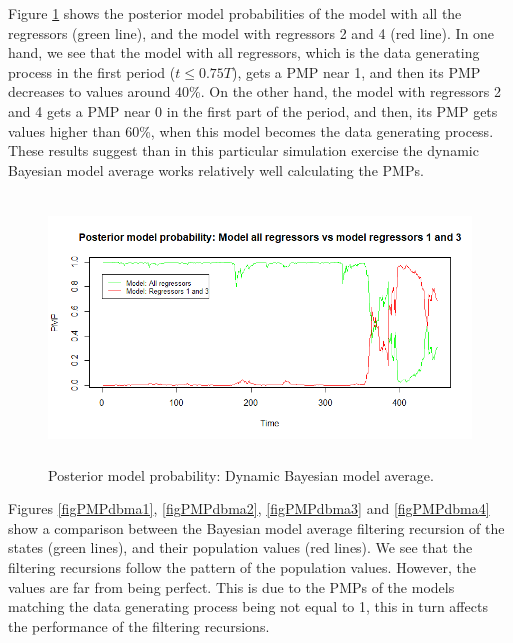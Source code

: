 Figure \ref{figPMPdbma} shows the posterior model probabilities of the model with all the regressors (green line), and the model with regressors 2 and 4 (red line). In one hand, we see that the model with all regressors, which is the data generating process in the first period ($t\leq 0.75T$), gets a PMP near 1, and then its PMP decreases to values around 40\%. On the other hand, the model with regressors 2 and 4 gets a PMP near 0 in the first part of the period, and then, its PMP gets values higher than 60\%, when this model becomes the data generating process. These results suggest than in this particular simulation exercise the dynamic Bayesian model average works relatively well calculating the PMPs. 
  
\begin{figure}[!h]
	\includegraphics[width=340pt, height=200pt]{Chapters/chapter8/figures/figPMPdbma.png}
	\caption[List of figure caption goes here]{Posterior model probability: Dynamic Bayesian model average.}\label{figPMPdbma}
\end{figure}

Figures \ref{figPMPdbma1}, \ref{figPMPdbma2}, \ref{figPMPdbma3} and \ref{figPMPdbma4} show a comparison between the Bayesian model average filtering recursion of the states (green lines), and their population values (red lines). We see that the filtering recursions follow the pattern of the population values. However, the values are far from being perfect. This is due to the PMPs of the models matching the data generating process being not equal to 1, this in turn affects the performance of the filtering recursions.  

